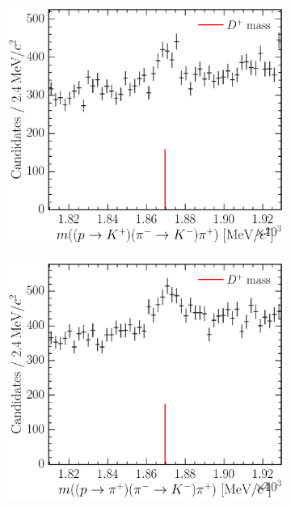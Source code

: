 \begin{figure}
  \begin{subfigure}[b]{0.3\textwidth}
    \includegraphics[width=\textwidth]{figures/cpv/selection/background_study/ppipi/LcToppipi_2012_MagDown_Dp_ppTokp_pimTokm_pip}
    \caption{\decay{\PDplus}{\PKplus\PKminus\Ppiplus}}
    \label{fig:cpv:selection:background_study:ppipi_meson:dplus_kkpi}
  \end{subfigure}
  \begin{subfigure}[b]{0.3\textwidth}
    \includegraphics[width=\textwidth]{figures/cpv/selection/background_study/ppipi/LcToppipi_2012_MagDown_Dp_ppTopip_pimTokm_pip}

\end{subfigure}
\end{figure}
